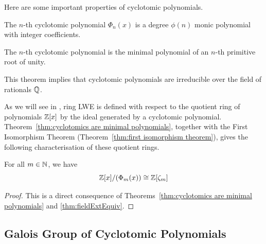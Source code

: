 \documentclass[../main.tex]{subfiles}
\begin{document}
Here are some important properties of cyclotomic polynomials.

\begin{theorem}
The $n$-th cyclotomic polynomial $\Phi_n(x)$ is a degree $\phi(n)$ monic polynomial with integer coefficients.
\end{theorem}

\begin{theorem}\label{thm:cyclotomics are minimal polynomials}
The $n$-th cyclotomic polynomial is the minimal polynomial \reversemarginpar
{}
 of an $n$-th primitive root of unity. 
\end{theorem}
This theorem implies that cyclotomic polynomials are irreducible over the field of rationals $\mathbb{Q}$. 
%

%
As we will see in , ring LWE is defined with respect to the quotient ring of polynomials $\mathbb{Z}[x]$ by the ideal generated by a cyclotomic polynomial.
Theorem~\ref{thm:cyclotomics are minimal polynomials}, together with the First Isomorphism Theorem (Theorem~\ref{thm:first isomorphism theorem}), gives the following characterisation of these quotient rings. \begin{theorem}\label{thm:ring LWE isomoprhic 1}
For all $m\in \mathbb{N}$, we have
\[ \mathbb{Z}[x]/(\Phi_m(x)) \cong \mathbb{Z}[\zeta_m] \]
\end{theorem}
\begin{proof}
This is a direct consequence of Theorems~\ref{thm:cyclotomics are minimal polynomials} and \ref{thm:fieldExtEquiv}.
\end{proof}

\subsection{Galois Group of Cyclotomic Polynomials}\label{subsec:galois group cyclotomics}
\end{document}
